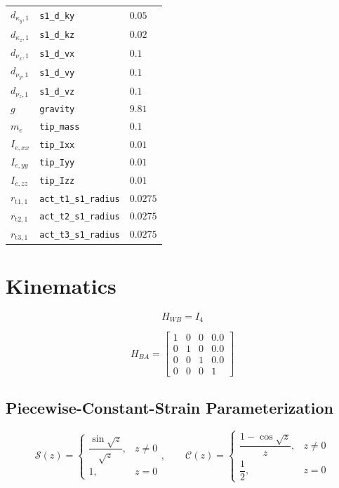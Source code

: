 \documentclass[11pt]{article}
\newcommand{\Sfun}{\mathcal{S}}
\newcommand{\Cfun}{\mathcal{C}}
\begin{document}
\begin{longtable}{lll}
$d_{\kappa_y,1}$ & \texttt{s1\_d\_ky} & $0.05$ \\
$d_{\kappa_z,1}$ & \texttt{s1\_d\_kz} & $0.02$ \\
$d_{\nu_x,1}$ & \texttt{s1\_d\_vx} & $0.1$ \\
$d_{\nu_y,1}$ & \texttt{s1\_d\_vy} & $0.1$ \\
$d_{\nu_z,1}$ & \texttt{s1\_d\_vz} & $0.1$ \\
$g$ & \texttt{gravity} & $9.81$ \\
$m_e$ & \texttt{tip\_mass} & $0.1$ \\
$I_{e,xx}$ & \texttt{tip\_Ixx} & $0.01$ \\
$I_{e,yy}$ & \texttt{tip\_Iyy} & $0.01$ \\
$I_{e,zz}$ & \texttt{tip\_Izz} & $0.01$ \\
$r_{\mathrm{t1},1}$ & \texttt{act\_t1\_s1\_radius} & $0.0275$ \\
$r_{\mathrm{t2},1}$ & \texttt{act\_t2\_s1\_radius} & $0.0275$ \\
$r_{\mathrm{t3},1}$ & \texttt{act\_t3\_s1\_radius} & $0.0275$ \\
\hline
\end{longtable}

\section{Kinematics}
\begin{equation}
H_{WB}=I_4
\end{equation}

\begin{equation}
H_{BA}=\begin{bmatrix}1 & 0 & 0 & 0.0\\0 & 1 & 0 & 0.0\\0 & 0 & 1 & 0.0\\0 & 0 & 0 & 1\end{bmatrix}\label{eq:mount-transform}
\end{equation}

\subsection{Piecewise-Constant-Strain Parameterization}
\begin{equation}
\Sfun(z)=\begin{cases}\dfrac{\sin\sqrt z}{\sqrt z},&z\ne0\\1,&z=0\end{cases},\qquad \Cfun(z)=\begin{cases}\dfrac{1-\cos\sqrt z}{z},&z\ne0\\\dfrac12,&z=0\end{cases}
\end{equation}
\end{document}
